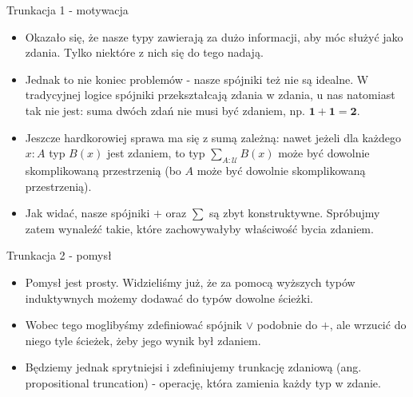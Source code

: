 \documentclass{beamer}
\newcommand{\U}{\mathcal{U}}
\begin{document}
\begin{frame}{Trunkacja 1 - motywacja}
\begin{itemize}
	\item Okazało się, że nasze typy zawierają za dużo informacji, aby móc służyć jako zdania. Tylko niektóre z nich się do tego nadają.
	\item Jednak to nie koniec problemów - nasze spójniki też nie są idealne. W tradycyjnej logice spójniki przekształcają zdania w zdania, u nas natomiast tak nie jest: suma dwóch zdań nie musi być zdaniem, np. $\textbf{1} + \textbf{1} = \textbf{2}$.
	\item Jeszcze hardkorowiej sprawa ma się z sumą zależną: nawet jeżeli dla każdego $x : A$ typ $B(x)$ jest zdaniem, to typ $\sum_{A : \U} B(x)$ może być dowolnie skomplikowaną przestrzenią (bo $A$ może być dowolnie skomplikowaną przestrzenią).
	\item Jak widać, nasze spójniki $+$ oraz $\sum$ są zbyt konstruktywne. Spróbujmy zatem wynaleźć takie, które zachowywałyby właściwość bycia zdaniem.
\end{itemize}
\end{frame}

\begin{frame}{Trunkacja 2 - pomysł}
\begin{itemize}
	\item Pomysł jest prosty. Widzieliśmy już, że za pomocą wyższych typów induktywnych możemy dodawać do typów dowolne ścieżki.
	\item Wobec tego moglibyśmy zdefiniować spójnik $\lor$ podobnie do $+$, ale wrzucić do niego tyle ścieżek, żeby jego wynik był zdaniem.
	\item Będziemy jednak sprytniejsi i zdefiniujemy trunkację zdaniową (ang. propositional truncation) - operację, która zamienia każdy typ w zdanie.
\end{itemize}
\end{frame}
\end{document}
